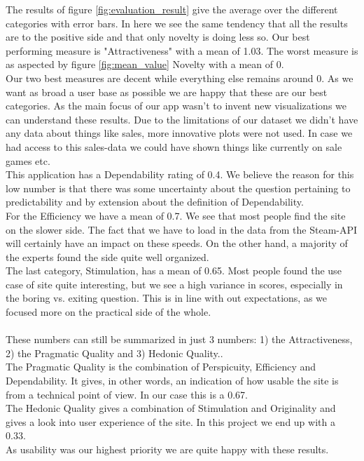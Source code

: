 \documentclass{article}
\begin{document}
	The results of figure \ref{fig:evaluation_result} give the average over the different categories with error bars. In here we see the same tendency that all the results are to the positive side and that only novelty is doing less so. Our best performing measure is "Attractiveness" with a mean of 1.03. The worst measure is as aspected by figure \ref{fig:mean_value} Novelty with a mean of 0.\\
	Our two best measures are decent while everything else remains around 0. As we want as broad a user base as possible we are happy that these are our best categories. As the main focus of our app wasn't to invent new visualizations we can understand these results. Due to the limitations of our dataset we didn't have any data about things like sales, more innovative plots were not used. In case we had access to this sales-data we could have shown things like currently on sale games etc.\\
	This application has a Dependability rating of 0.4. We believe the reason for this low number is that there was some uncertainty about the question pertaining to predictability and by extension about the definition of Dependability.\\
	For the Efficiency we have a mean of 0.7. We see that most people find the site on the slower side. The fact that we have to load in the data from the Steam-API will certainly have an impact on these speeds. On the other hand, a majority of the experts found the side quite well organized.\\
	The last category, Stimulation, has a mean of 0.65. Most people found the use case of site quite interesting, but we see a high variance in scores, especially in the boring vs. exiting question. This is in line with out expectations, as we focused more on the practical side of the whole.\\
	\\
	These numbers can still be summarized in just 3 numbers: 1) the Attractiveness, 2) the Pragmatic Quality and 3) Hedonic Quality..\\
	The Pragmatic Quality is the combination of Perspicuity, Efficiency and Dependability. It gives, in other words, an indication of how usable the site is from a technical point of view. In our case this is a 0.67.\\
	The Hedonic Quality gives a combination of Stimulation and Originality and gives a look into user experience of the site. In this project we end up with a 0.33.\\
	As usability was our highest priority we are quite happy with these results.\\
	
\end{document}
